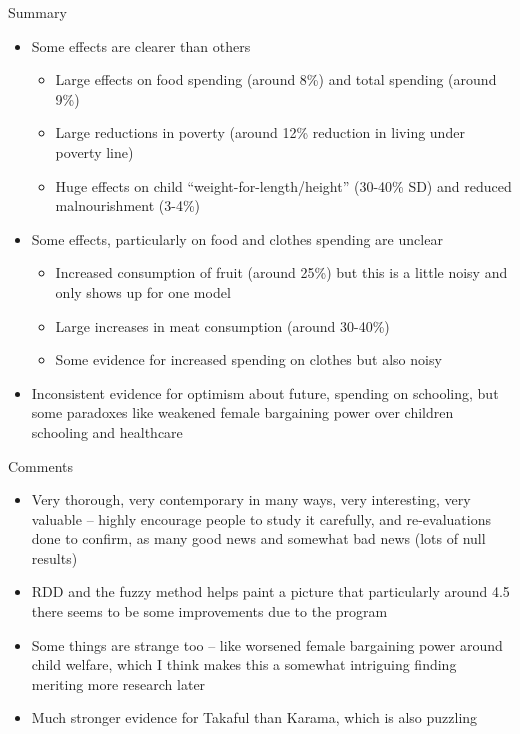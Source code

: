 \documentclass{beamer}
\begin{document}
\begin{frame}{Summary}

\begin{itemize}
\item Some effects are clearer than others

	\begin{itemize}
	\item Large effects on food spending (around 8\%) and total spending (around 9\%)
	\item Large reductions in poverty (around 12\% reduction in living under poverty line)
	\item Huge effects on child ``weight-for-length/height'' (30-40\% SD) and reduced malnourishment (3-4\%)
	\end{itemize}
\item Some effects, particularly on food and clothes spending are unclear
	\begin{itemize}
	\item Increased consumption of fruit (around 25\%) but this is a little noisy and only shows up for one model
	\item Large increases in meat consumption (around 30-40\%)
	\item Some evidence for increased spending on clothes but also noisy
	\end{itemize}
\item Inconsistent evidence for optimism about future, spending on schooling, but some paradoxes like weakened female bargaining power over children schooling and healthcare
\end{itemize}

\end{frame}

\begin{frame}{Comments}

\begin{itemize}
\item Very thorough, very contemporary in many ways, very interesting, very valuable -- highly encourage people to study it carefully, and re-evaluations done to confirm, as many good news and somewhat bad news (lots of null results)
\item RDD and the fuzzy method helps paint a picture that particularly around 4.5 there seems to be some improvements due to the program
\item Some things are strange too -- like worsened female bargaining power around child welfare, which I think makes this a somewhat intriguing finding meriting more research later
\item Much stronger evidence for Takaful than Karama, which is also puzzling

\end{itemize}

\end{frame}
\end{document}
